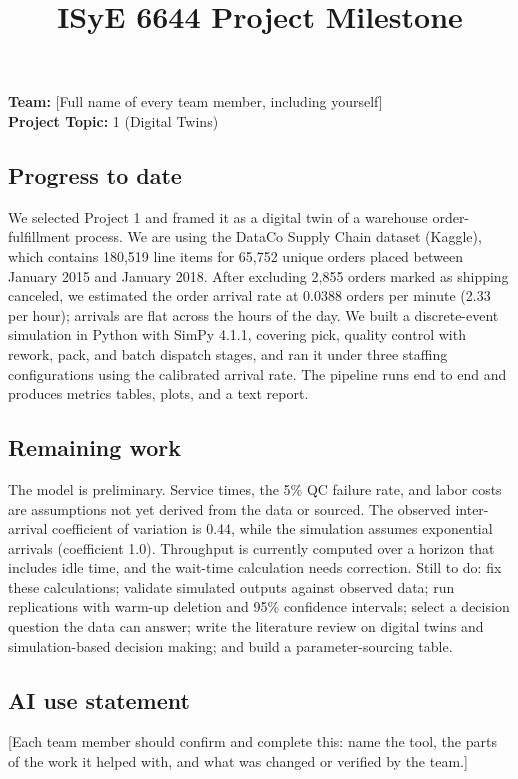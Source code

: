 \documentclass[11pt]{article}
\title{ISyE 6644 Project Milestone}
\author{}
\date{}
\begin{document}
\maketitle

\noindent\textbf{Team:} [Full name of every team member, including yourself]\\
\textbf{Project Topic:} 1 (Digital Twins)

\subsection*{Progress to date}
We selected Project 1 and framed it as a digital twin of a warehouse order-fulfillment process. We are using the DataCo Supply Chain dataset (Kaggle), which contains 180,519 line items for 65,752 unique orders placed between January 2015 and January 2018. After excluding 2,855 orders marked as shipping canceled, we estimated the order arrival rate at 0.0388 orders per minute (2.33 per hour); arrivals are flat across the hours of the day. We built a discrete-event simulation in Python with SimPy 4.1.1, covering pick, quality control with rework, pack, and batch dispatch stages, and ran it under three staffing configurations using the calibrated arrival rate. The pipeline runs end to end and produces metrics tables, plots, and a text report.

\subsection*{Remaining work}
The model is preliminary. Service times, the 5\% QC failure rate, and labor costs are assumptions not yet derived from the data or sourced. The observed inter-arrival coefficient of variation is 0.44, while the simulation assumes exponential arrivals (coefficient 1.0). Throughput is currently computed over a horizon that includes idle time, and the wait-time calculation needs correction. Still to do: fix these calculations; validate simulated outputs against observed data; run replications with warm-up deletion and 95\% confidence intervals; select a decision question the data can answer; write the literature review on digital twins and simulation-based decision making; and build a parameter-sourcing table.

\subsection*{AI use statement}
[Each team member should confirm and complete this: name the tool, the parts of the work it helped with, and what was changed or verified by the team.]
\end{document}

